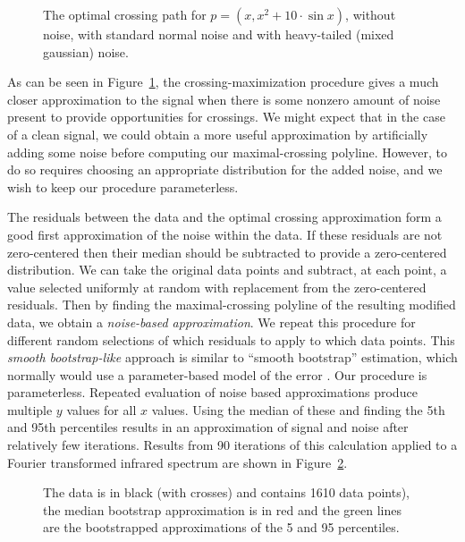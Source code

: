 \documentclass{article}
\begin{document}
\begin{figure}
\qquad
{}
\qquad
{}
\caption{The optimal crossing path for $p=(x,x^2+10\cdot \sin x)$, without
noise, with standard normal noise and with heavy-tailed (mixed gaussian)
noise.}
\label{fig:cleanresults}
\end{figure}

As can be seen in Figure~\ref{fig:cleanresults}, the crossing-maximization
procedure gives a much closer approximation to the signal when there is some
nonzero amount of noise present to provide opportunities for crossings.  We
might expect that in the case of a clean signal, we could obtain a more
useful approximation by artificially adding some noise before computing our
maximal-crossing polyline.  However, to do so requires choosing an
appropriate distribution for the added noise, and we wish to keep our
procedure parameterless.

The residuals between the data and the optimal crossing approximation form a good
first approximation of the noise within the data.  If these residuals are not
zero-centered then their median should be subtracted to provide a
zero-centered distribution.  We can take the original data points and
subtract, at each point, a value selected uniformly at random with
replacement from the zero-centered residuals.  Then by finding the
maximal-crossing polyline of the resulting modified data, we obtain a
\emph{noise-based approximation}.  We repeat this procedure for different random
selections of which residuals to apply to which data points.  This
\emph{smooth bootstrap-like} approach is similar to ``smooth bootstrap''
estimation, which normally would use a parameter-based model of the error
\cite{wilcox:2010fk}.  Our procedure is parameterless.  Repeated evaluation
of noise based approximations produce multiple $y$ values for all $x$ values. 
Using the median of these and finding the 5th and 95th percentiles results
in an approximation of signal and noise after relatively few iterations.  Results
from 90 iterations of this calculation applied to a Fourier transformed
infrared spectrum are shown in Figure~\ref{fig:ftir}.

\begin{figure}
	\qquad
\caption{The data is in black (with crosses) and contains 1610 data points), the median bootstrap approximation is in red and the green lines are the bootstrapped approximations of the 5 and 95 percentiles.}
\label{fig:ftir}
\end{figure} 
\end{document}

